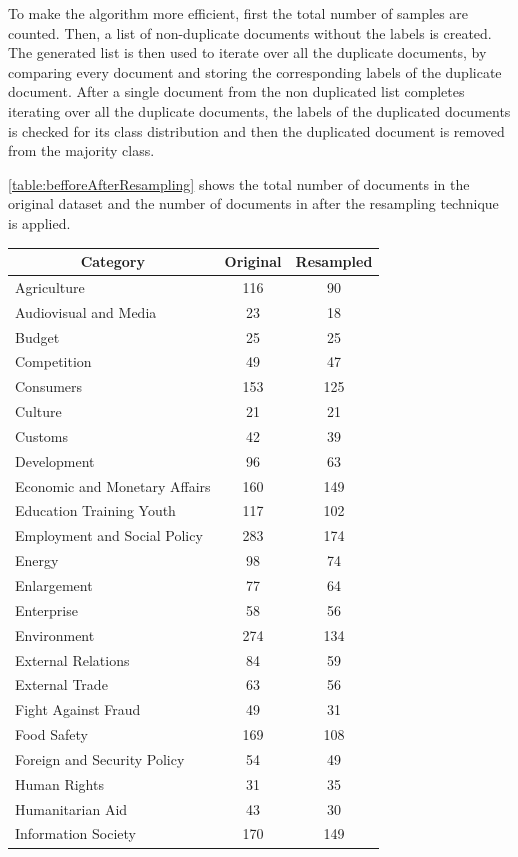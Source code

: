 To make the algorithm more efficient, first the total number of samples are counted. Then, a list of non-duplicate documents without the labels is created. The generated list is then used to iterate over all the duplicate documents, by comparing every document and storing the corresponding labels of the duplicate document. After a single document from the non duplicated list completes iterating over all the duplicate documents, the labels of the duplicated documents is checked for its class distribution and then the duplicated document is removed from the majority class.

\ref{table:befforeAfterResampling} shows the total number of documents in the original dataset and the number of documents in after the resampling technique is applied.

\begin{table}[!ht]
\centering
\begin{tabular}{lcc}
\hline
\multicolumn{1}{c}{Category} & Original & Resampled \\ \hline
Agriculture & 116 & 90 \\
Audiovisual and Media & 23 & 18 \\
Budget & 25 & 25 \\
Competition & 49 & 47 \\
Consumers & 153 & 125 \\
Culture & 21 & 21 \\
Customs & 42 & 39 \\
Development & 96 & 63 \\
Economic and Monetary Affairs & 160 & 149 \\
Education Training Youth & 117 & 102 \\
Employment and Social Policy & 283 & 174 \\
Energy & 98 & 74 \\
Enlargement & 77 & 64 \\
Enterprise & 58 & 56 \\
Environment & 274 & 134 \\
External Relations & 84 & 59 \\
External Trade & 63 & 56 \\
Fight Against Fraud & 49 & 31 \\
Food Safety & 169 & 108 \\
Foreign and Security Policy & 54 & 49 \\
Human Rights & 31 & 35 \\
Humanitarian Aid & 43 & 30 \\
Information Society & 170 & 149 \\

\end{tabular}
\end{table}

